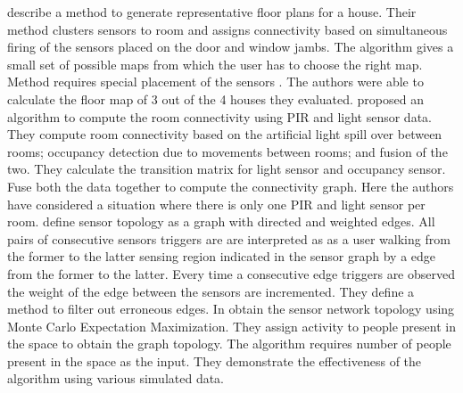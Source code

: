 \citeauthor{Lu:2014:SBS:2648771.2629441}\cite{Lu:2014:SBS:2648771.2629441} describe a method to generate representative floor plans for a house. Their method clusters sensors to room and assigns connectivity based on simultaneous firing of the sensors placed on the door and window jambs. The algorithm gives a small set of possible maps from which the user has to choose the right map. Method requires special placement of the sensors . The authors were able to calculate the floor map of 3 out of the 4 houses they evaluated.  
 \citeauthor{ellis2012creating}\cite{ellis2012creating} proposed an algorithm to compute the room connectivity using  PIR and light sensor data. They compute room connectivity based on the artificial light spill over between rooms; occupancy detection due to movements between
  rooms; and fusion of the two. They calculate the transition matrix for light sensor and occupancy sensor. Fuse both the data together to compute the connectivity graph. Here the authors have considered a situation where there is only one PIR and light sensor per room.
\citeauthor{muller2014automated} define  sensor topology as a graph with directed and weighted edges. All pairs of consecutive sensors triggers are are interpreted as as a user walking from the former to the latter sensing region indicated in the sensor 
graph by a edge from the former to the latter. Every time a consecutive edge triggers are observed the weight of the edge between the sensors are incremented. They define a method to filter out erroneous edges.
In \cite{marinakis2005learning} \citeauthor{marinakis2005learning} obtain the sensor network topology using Monte Carlo Expectation Maximization. They assign activity to people present in the space to obtain the graph topology. The algorithm requires number of people present in the space as the input. They demonstrate the effectiveness of the algorithm using various simulated data. 




